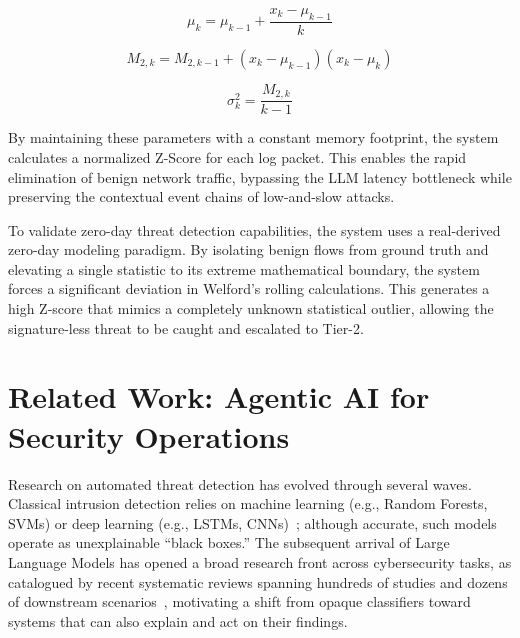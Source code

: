 \begin{equation}
    \label{eq:welford_mean}
    \mu_k = \mu_{k-1} + \frac{x_k - \mu_{k-1}}{k}
\end{equation}

\begin{equation}
    \label{eq:welford_m2}
    M_{2,k} = M_{2,k-1} + (x_k - \mu_{k-1})(x_k - \mu_k)
\end{equation}

\begin{equation}
    \label{eq:welford_var}
    \sigma_k^2 = \frac{M_{2,k}}{k-1}
\end{equation}

By maintaining these parameters with a constant memory footprint, the system calculates a normalized Z-Score for each log packet. This enables the rapid elimination of benign network traffic, bypassing the LLM latency bottleneck while preserving the contextual event chains of low-and-slow attacks.

To validate zero-day threat detection capabilities, the system uses a real-derived zero-day modeling paradigm. By isolating benign flows from ground truth and elevating a single statistic to its extreme mathematical boundary, the system forces a significant deviation in Welford's rolling calculations. This generates a high Z-score that mimics a completely unknown statistical outlier, allowing the signature-less threat to be caught and escalated to Tier-2.

\section{Related Work: Agentic AI for Security Operations}

Research on automated threat detection has evolved through several waves. Classical intrusion detection relies on machine learning (e.g., Random Forests, SVMs) or deep learning (e.g., LSTMs, CNNs)~\cite{mlids2016}; although accurate, such models operate as unexplainable ``black boxes.'' The subsequent arrival of Large Language Models has opened a broad research front across cybersecurity tasks, as catalogued by recent systematic reviews spanning hundreds of studies and dozens of downstream scenarios~\cite{llmsec_survey2025}, motivating a shift from opaque classifiers toward systems that can also explain and act on their findings.

